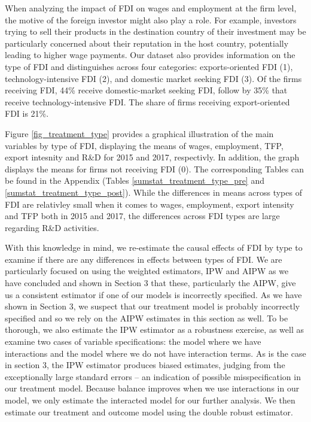 When analyzing the impact of FDI on wages and employment at the firm level, the  motive of the foreign investor might also play a role. For example, investors trying to sell their products in the destination country of their investment  may be particularly concerned about their reputation in the host country, potentially leading to higher wage payments. Our dataset also provides information on the type of FDI and distinguishes across four categories: exports-oriented FDI (1),  technology-intensive FDI (2), and domestic market seeking FDI (3). Of the firms receiving FDI, 44\% receive domestic-market seeking FDI, follow by 35\% that receive technology-intensive FDI. The share of firms receiving export-oriented FDI is 21\%. \\ \par

Figure \ref{fig_treatment_type} provides a graphical illustration of the main variables by type of FDI, displaying the means of wages, employment, TFP, export intesnity and R\&D for 2015 and 2017, respectivly. In addition, the graph displays the means for firms not receiving FDI (0). The corresponding Tables can be found in the Appendix (Tables \ref{sumstat_treatment_type_pre} and \ref{sumstat_treatment_type_post}). While the differences in means across types of FDI are relativley small when it comes to wages, employment, export intensity and TFP both in 2015 and 2017, the differences across FDI types are large regarding R\&D activities.\\ \par

With this knowledge in mind, we re-estimate the causal effects of FDI by type to examine if there are any differences in effects between types of FDI. We are particularly focused on using the weighted estimators, IPW and AIPW as we have concluded and shown in Section 3 that these, particularly the AIPW, give us a consistent estimator if one of our models is incorrectly specified. As we have shown in Section 3, we suspect that our treatment model is probably incorrectly specified and so we rely on the AIPW estimates in this section as well. To be thorough, we also estimate the IPW estimator as a robustness exercise, as well as examine two cases of variable specifications: the model where we have interactions and the model where we do not have interaction terms. As is the case in section 3, the IPW estimator produces biased estimates, judging from the exceptionally large standard errors – an indication of possible misspecification in our treatment model. Because balance improves when we use interactions in our model, we only estimate the interacted model for our further analysis. We then estimate our treatment and outcome model using the double robust estimator. 

